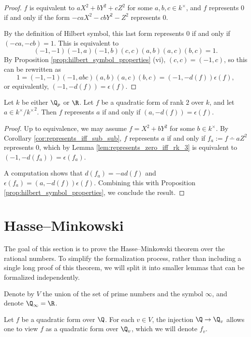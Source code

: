 \begin{proof}
\leanok
$f$ is equivalent to $aX^2 + bY^2 + cZ^2$ for some $a, b, c \in k^\times$, and $f$ represents $0$ if and only if the form $-caX^2 -cbY^2 - Z^2$ represents $0$.

By the definition of Hilbert symbol, this last form represents $0$ if and only if $(-ca, -cb) = 1$.
This is equivalent to
\[ (-1, -1)(-1, a)(-1, b)(c, c)(a, b)(a, c)(b, c) = 1. \]
By Proposition \ref{prop:hilbert_symbol_properties} (vi), $(c, c) = (-1, c)$, so this can be rewritten as
\[ 1 = (-1, -1)(-1, abc)(a, b)(a, c)(b, c) = (-1, -d(f))\epsilon(f), \]
or equivalently, $(-1, -d(f)) = \epsilon(f)$.
\end{proof}

\begin{lemma}\label{lem:represents_iff_rk_2}
\leanok
{}
Let $k$ be either $\Q_p$ or $\R$. Let $f$ be a quadratic form of rank $2$ over $k$, and let $a \in k^\times / {k^\times}^2$. Then $f$ represents $a$ if and only if $(a, -d(f)) = \epsilon(f)$.
\end{lemma}
\begin{proof}
\leanok
Up to equivalence, we may assume $f = X^2 + bY^2$ for some $b \in k^\times$. By Corollary \ref{cor:represents_iff_sub_sub}, $f$ represents $a$ if and only if $f_a := f \dotminus aZ^2$ represents $0$, which by Lemma \ref{lem:represents_zero_iff_rk_3} is equivalent to $(-1, -d(f_a)) = \epsilon(f_a)$.

A computation shows that $d(f_a) = -a d(f)$ and $\epsilon(f_a) = (a, -d(f)) \epsilon (f)$. Combining this with Proposition \ref{prop:hilbert_symbol_properties}, we conclude the result.
\end{proof}

\section{Hasse--Minkowski}\label{sec:Hasse--Minkowski}

The goal of this section is to prove the Hasse--Minkowski theorem over the rational numbers. To simplify the formalization process, rather than including a single long proof of this theorem, we will split it into smaller lemmas that can be formalized independently.

Denote by $V$ the union of the set of prime numbers and the symbol $\infty$, and denote $\Q_\infty = \R$.

Let $f$ be a quadratic form over $\Q$. For each $v \in V$, the injection $\Q \to \Q_v$ allows one to view $f$ as a quadratic form over $\Q_v$, which we will denote $f_v$.

